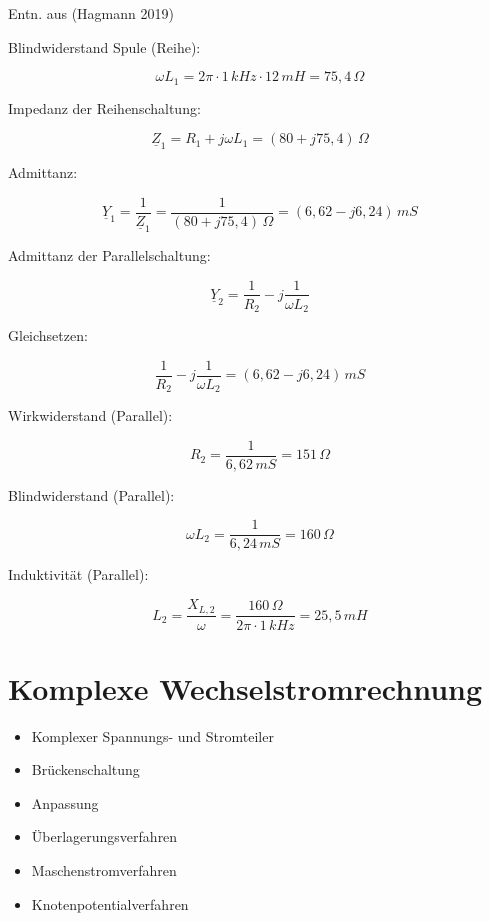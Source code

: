 \documentclass[
  ngerman,
  letterpaper,
]{scrbook}
\providecommand{\tightlist}{%
  \setlength{\itemsep}{0pt}\setlength{\parskip}{0pt}}
\begin{document}
Entn. aus (Hagmann 2019)

\begin{tcolorbox}[enhanced jigsaw, titlerule=0mm, rightrule=.15mm, toprule=.15mm, colback=white, toptitle=1mm, bottomrule=.15mm, coltitle=black, leftrule=.75mm, arc=.35mm, colbacktitle=quarto-callout-caution-color!10!white, opacityback=0, bottomtitle=1mm, colframe=quarto-callout-caution-color-frame, opacitybacktitle=0.6, breakable, title=\textcolor{quarto-callout-caution-color}{\faFire}\hspace{0.5em}{Lösung 6.7}, left=2mm]

Blindwiderstand Spule (Reihe):

\[\omega L_1 = 2 \pi \cdot 1\,kHz \cdot 12\,mH = 75,4\,\Omega\]

Impedanz der Reihenschaltung:

\[\underline{Z}_1 = R_1 + j \omega L_1 = (80 + j75,4)\,\Omega\]

Admittanz:

\[\underline{Y}_1 = \frac{1}{\underline{Z}_1} = \frac{1}{(80 + j75,4)\,\Omega} = (6,62 - j6,24)\,mS\]

Admittanz der Parallelschaltung:

\[\underline{Y}_2 = \frac{1}{R_2} - j\frac{1}{\omega L_2}\]

Gleichsetzen:

\[\frac{1}{R_2} - j\frac{1}{\omega L_2} = (6,62 - j6,24)\,mS\]

Wirkwiderstand (Parallel):

\[R_2 = \frac{1}{6,62\,mS} = 151\,\Omega\]

Blindwiderstand (Parallel):

\[\omega L_2 = \frac{1}{6,24\,mS} = 160\,\Omega\]

Induktivität (Parallel):

\[L_2 = \frac{X_{L,2}}{\omega} = \frac{160\,\Omega}{2 \pi \cdot 1\,kHz} = 25,5\,mH\]

\end{tcolorbox}

\chapter{Komplexe
Wechselstromrechnung}\label{komplexe-wechselstromrechnung-1}

\begin{itemize}
\tightlist
\item
  Komplexer Spannungs- und Stromteiler
\item
  Brückenschaltung
\item
  Anpassung
\item
  Überlagerungsverfahren
\item
  Maschenstromverfahren
\item
  Knotenpotentialverfahren
\end{itemize}
\end{document}
